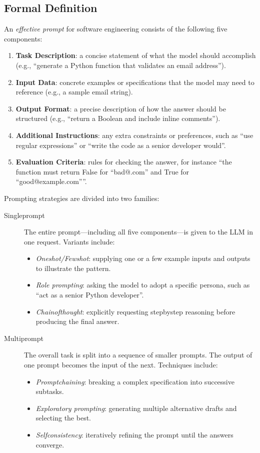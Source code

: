 \documentclass[12pt, a4paper]{article}
\begin{document}
\subsection{Formal Definition}
An \emph{effective prompt} for software engineering consists of the following five components:

\begin{enumerate}
    \item \textbf{Task Description}: a concise statement of what the model should accomplish (e.g., ``generate a Python function that validates an email address'').
    \item \textbf{Input Data}: concrete examples or specifications that the model may need to reference (e.g., a sample email string).
    \item \textbf{Output Format}: a precise description of how the answer should be structured (e.g., ``return a Boolean and include inline comments'').
    \item \textbf{Additional Instructions}: any extra constraints or preferences, such as ``use regular expressions'' or ``write the code as a senior developer would''.
    \item \textbf{Evaluation Criteria}: rules for checking the answer, for instance ``the function must return False for ``bad@.com'' and True for ``good@example.com''''.
\end{enumerate}

Prompting strategies are divided into two families:

\begin{description}
    \item[Singleprompt] The entire prompt---including all five components---is given to the LLM in one request.  Variants include:
    \begin{itemize}
        \item \emph{Oneshot/Fewshot}: supplying one or a few example inputs and outputs to illustrate the pattern.
        \item \emph{Role prompting}: asking the model to adopt a specific persona, such as ``act as a senior Python developer''.
        \item \emph{Chainofthought}: explicitly requesting stepbystep reasoning before producing the final answer.
    \end{itemize}
    \item[Multiprompt] The overall task is split into a sequence of smaller prompts.  The output of one prompt becomes the input of the next.  Techniques include:
    \begin{itemize}
        \item \emph{Promptchaining}: breaking a complex specification into successive subtasks.
        \item \emph{Exploratory prompting}: generating multiple alternative drafts and selecting the best.
        \item \emph{Selfconsistency}: iteratively refining the prompt until the answers converge.
    \end{itemize}
\end{description}
\end{document}
